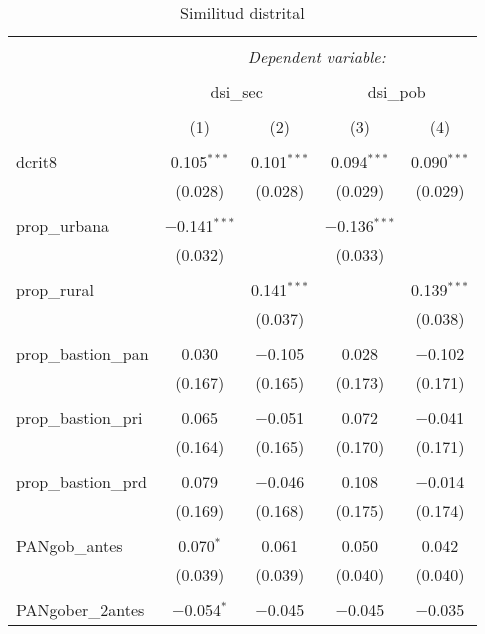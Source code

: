 
\begin{table}[!htbp] \centering 
  \caption{Similitud distrital} 
  \label{} 
\begin{tabular}{@{\extracolsep{5pt}}lcccc} 
\\[-1.8ex]\hline 
\hline \\[-1.8ex] 
 & \multicolumn{4}{c}{\textit{Dependent variable:}} \\ 
\cline{2-5} 
\\[-1.8ex] & \multicolumn{2}{c}{dsi\_sec} & \multicolumn{2}{c}{dsi\_pob} \\ 
\\[-1.8ex] & (1) & (2) & (3) & (4)\\ 
\hline \\[-1.8ex] 
 dcrit8 & 0.105$^{***}$ & 0.101$^{***}$ & 0.094$^{***}$ & 0.090$^{***}$ \\ 
  & (0.028) & (0.028) & (0.029) & (0.029) \\ 
  & & & & \\ 
 prop\_urbana & $-$0.141$^{***}$ &  & $-$0.136$^{***}$ &  \\ 
  & (0.032) &  & (0.033) &  \\ 
  & & & & \\ 
 prop\_rural &  & 0.141$^{***}$ &  & 0.139$^{***}$ \\ 
  &  & (0.037) &  & (0.038) \\ 
  & & & & \\ 
 prop\_bastion\_pan & 0.030 & $-$0.105 & 0.028 & $-$0.102 \\ 
  & (0.167) & (0.165) & (0.173) & (0.171) \\ 
  & & & & \\ 
 prop\_bastion\_pri & 0.065 & $-$0.051 & 0.072 & $-$0.041 \\ 
  & (0.164) & (0.165) & (0.170) & (0.171) \\ 
  & & & & \\ 
 prop\_bastion\_prd & 0.079 & $-$0.046 & 0.108 & $-$0.014 \\ 
  & (0.169) & (0.168) & (0.175) & (0.174) \\ 
  & & & & \\ 
 PANgob\_antes & 0.070$^{*}$ & 0.061 & 0.050 & 0.042 \\ 
  & (0.039) & (0.039) & (0.040) & (0.040) \\ 
  & & & & \\ 
 PANgober\_2antes & $-$0.054$^{*}$ & $-$0.045 & $-$0.045 & $-$0.035 \\ 

\end{tabular}
\end{table}
